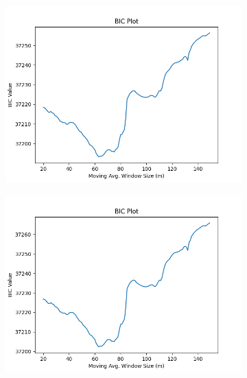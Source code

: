 \documentclass[12pt]{article}
\begin{document}
\begin{figure}[!ht]
  \begin{subfigure}[!ht]{0.45\textwidth}
    \includegraphics[width=\linewidth]{Prop_Both}
  \end{subfigure}\hfill
  \begin{subfigure}[!ht]{0.45\textwidth}
    \includegraphics[width=\linewidth]{Both}
  \end{subfigure}


\end{figure}
\end{document}
